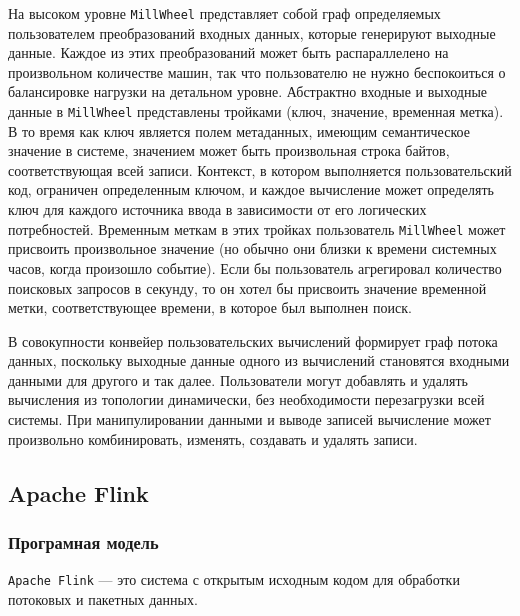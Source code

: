 На высоком уровне \texttt{MillWheel} представляет собой граф определяемых пользователем преобразований входных данных, которые генерируют выходные данные. Каждое из этих преобразований может быть распараллелено на произвольном количестве машин, так что пользователю не нужно беспокоиться о балансировке нагрузки на детальном уровне. Абстрактно входные и выходные данные в \texttt{MillWheel} представлены тройками (ключ, значение, временная метка). 
В то время как ключ является полем метаданных, имеющим семантическое значение в системе, значением может быть произвольная строка байтов, соответствующая всей записи. 
Контекст, в котором выполняется пользовательский код, ограничен определенным ключом, и каждое вычисление может определять ключ для каждого источника ввода в зависимости от его логических потребностей. 
Временным меткам в этих тройках пользователь \texttt{MillWheel} может присвоить произвольное значение (но обычно они близки к времени системных часов, когда произошло событие). Если бы пользователь агрегировал количество поисковых запросов в секунду, то он хотел бы присвоить значение временной метки, соответствующее времени, в которое был выполнен поиск.

В совокупности конвейер пользовательских вычислений формирует граф потока данных, поскольку выходные данные одного из вычислений становятся входными данными для другого и так далее.
Пользователи могут добавлять и удалять вычисления из топологии динамически, без необходимости перезагрузки всей системы. 
При манипулировании данными и выводе записей вычисление может произвольно комбинировать, изменять, создавать и удалять записи.

\subsection{Apache Flink}

\subsubsection{Програмная модель}

\texttt{Apache Flink} --- это система с открытым исходным кодом для обработки потоковых и пакетных данных.

